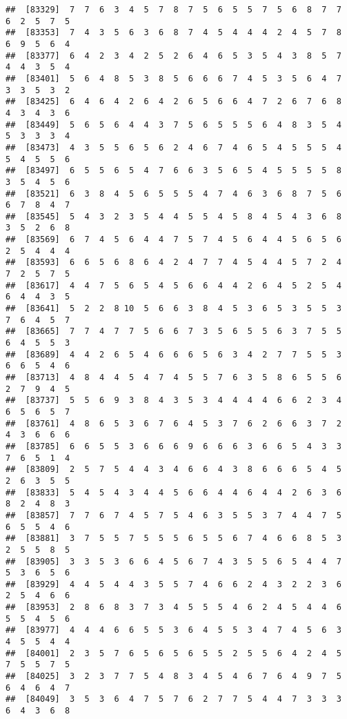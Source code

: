\documentclass[
]{book}
\begin{document}
\begin{verbatim}
##  [83329]  7  7  6  3  4  5  7  8  7  5  6  5  5  7  5  6  8  7  7  6  2  5  7  5
##  [83353]  7  4  3  5  6  3  6  8  7  4  5  4  4  4  2  4  5  7  8  6  9  5  6  4
##  [83377]  6  4  2  3  4  2  5  2  6  4  6  5  3  5  4  3  8  5  7  4  4  3  5  4
##  [83401]  5  6  4  8  5  3  8  5  6  6  6  7  4  5  3  5  6  4  7  3  3  5  3  2
##  [83425]  6  4  6  4  2  6  4  2  6  5  6  6  4  7  2  6  7  6  8  4  3  4  3  6
##  [83449]  5  6  5  6  4  4  3  7  5  6  5  5  5  6  4  8  3  5  4  5  3  3  3  4
##  [83473]  4  3  5  5  6  5  6  2  4  6  7  4  6  5  4  5  5  5  4  5  4  5  5  6
##  [83497]  6  5  5  6  5  4  7  6  6  3  5  6  5  4  5  5  5  5  8  3  5  4  5  6
##  [83521]  6  3  8  4  5  6  5  5  5  4  7  4  6  3  6  8  7  5  6  6  7  8  4  7
##  [83545]  5  4  3  2  3  5  4  4  5  5  4  5  8  4  5  4  3  6  8  3  5  2  6  8
##  [83569]  6  7  4  5  6  4  4  7  5  7  4  5  6  4  4  5  6  5  6  2  5  4  4  4
##  [83593]  6  6  5  6  8  6  4  2  4  7  7  4  5  4  4  5  7  2  4  7  2  5  7  5
##  [83617]  4  4  7  5  6  5  4  5  6  6  4  4  2  6  4  5  2  5  4  6  4  4  3  5
##  [83641]  5  2  2  8 10  5  6  6  3  8  4  5  3  6  5  3  5  5  3  7  6  4  5  7
##  [83665]  7  7  4  7  7  5  6  6  7  3  5  6  5  5  6  3  7  5  5  6  4  5  5  3
##  [83689]  4  4  2  6  5  4  6  6  6  5  6  3  4  2  7  7  5  5  3  6  6  5  4  6
##  [83713]  4  8  4  4  5  4  7  4  5  5  7  6  3  5  8  6  5  5  6  2  7  9  4  5
##  [83737]  5  5  6  9  3  8  4  3  5  3  4  4  4  4  6  6  2  3  4  6  5  6  5  7
##  [83761]  4  8  6  5  3  6  7  6  4  5  3  7  6  2  6  6  3  7  2  4  3  6  6  6
##  [83785]  6  6  5  5  3  6  6  6  9  6  6  6  3  6  6  5  4  3  3  7  6  5  1  4
##  [83809]  2  5  7  5  4  4  3  4  6  6  4  3  8  6  6  6  5  4  5  2  6  3  5  5
##  [83833]  5  4  5  4  3  4  4  5  6  6  4  4  6  4  4  2  6  3  6  8  2  4  8  3
##  [83857]  7  7  6  7  4  5  7  5  4  6  3  5  5  3  7  4  4  7  5  6  5  5  4  6
##  [83881]  3  7  5  5  7  5  5  5  6  5  5  6  7  4  6  6  8  5  3  2  5  5  8  5
##  [83905]  3  3  5  3  6  6  4  5  6  7  4  3  5  5  6  5  4  4  7  5  3  6  5  6
##  [83929]  4  4  5  4  4  3  5  5  7  4  6  6  2  4  3  2  2  3  6  2  5  4  6  6
##  [83953]  2  8  6  8  3  7  3  4  5  5  5  4  6  2  4  5  4  4  6  5  5  4  5  6
##  [83977]  4  4  4  6  6  5  5  3  6  4  5  5  3  4  7  4  5  6  3  4  5  5  4  4
##  [84001]  2  3  5  7  6  5  6  5  6  5  5  2  5  5  6  4  2  4  5  7  5  5  7  5
##  [84025]  3  2  3  7  7  5  4  8  3  4  5  4  6  7  6  4  9  7  5  6  4  6  4  7
##  [84049]  3  5  3  6  4  7  5  7  6  2  7  7  5  4  4  7  3  3  3  6  4  3  6  8

\end{verbatim}
\end{document}
